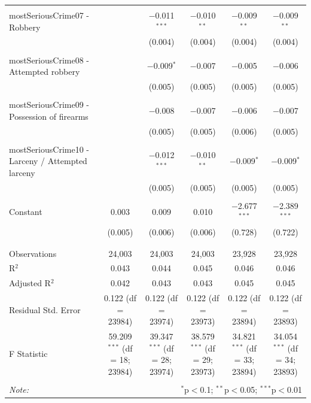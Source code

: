 \documentclass[a4paper,12pt]{article}
\begin{document}
\begin{table}[!htbp]
{\begin{tabular}{@{\extracolsep{5pt}}lccccc}
  & & & & & \\ 
 mostSeriousCrime07 - Robbery &  & $-$0.011$^{***}$ & $-$0.010$^{**}$ & $-$0.009$^{**}$ & $-$0.009$^{**}$ \\ 
  &  & (0.004) & (0.004) & (0.004) & (0.004) \\ 
  & & & & & \\ 
 mostSeriousCrime08 - Attempted robbery &  & $-$0.009$^{*}$ & $-$0.007 & $-$0.005 & $-$0.006 \\ 
  &  & (0.005) & (0.005) & (0.005) & (0.005) \\ 
  & & & & & \\ 
 mostSeriousCrime09 - Possession of firearms &  & $-$0.008 & $-$0.007 & $-$0.006 & $-$0.007 \\ 
  &  & (0.005) & (0.005) & (0.006) & (0.005) \\ 
  & & & & & \\ 
 mostSeriousCrime10 - Larceny / Attempted larceny &  & $-$0.012$^{***}$ & $-$0.010$^{**}$ & $-$0.009$^{*}$ & $-$0.009$^{*}$ \\ 
  &  & (0.005) & (0.005) & (0.005) & (0.005) \\ 
  & & & & & \\ 
  
 Constant & 0.003 & 0.009 & 0.010 & $-$2.677$^{***}$ & $-$2.389$^{***}$ \\ 
  & (0.005) & (0.006) & (0.006) & (0.728) & (0.722) \\ 
  & & & & & \\ 
\hline \\[-1.8ex] 
Observations & 24,003 & 24,003 & 24,003 & 23,928 & 23,928 \\ 
R$^{2}$ & 0.043 & 0.044 & 0.045 & 0.046 & 0.046 \\ 
Adjusted R$^{2}$ & 0.042 & 0.043 & 0.043 & 0.045 & 0.045 \\ 
Residual Std. Error & 0.122 (df = 23984) & 0.122 (df = 23974) & 0.122 (df = 23973) & 0.122 (df = 23894) & 0.122 (df = 23893) \\ 
F Statistic & 59.209$^{***}$ (df = 18; 23984) & 39.347$^{***}$ (df = 28; 23974) & 38.579$^{***}$ (df = 29; 23973) & 34.821$^{***}$ (df = 33; 23894) & 34.054$^{***}$ (df = 34; 23893) \\ 
\hline 
\hline \\[-1.8ex] 
\textit{Note:}  & \multicolumn{5}{r}{$^{*}$p$<$0.1; $^{**}$p$<$0.05; $^{***}$p$<$0.01} \\ 
\end{tabular} }
\end{table} 
\end{document}
